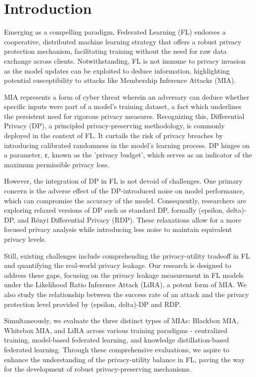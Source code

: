 \section{Introduction}

Emerging as a compelling paradigm, Federated Learning (FL) endorses a cooperative, distributed machine learning strategy that offers a robust privacy protection mechanism, facilitating training without the need for raw data exchange across clients. Notwithstanding, FL is not immune to privacy invasion as the model updates can be exploited to deduce information, highlighting potential susceptibility to attacks like Membership Inference Attacks (MIA).

MIA represents a form of cyber threat wherein an adversary can deduce whether specific inputs were part of a model's training dataset, a fact which underlines the persistent need for rigorous privacy measures. Recognizing this, Differential Privacy (DP), a principled privacy-preserving methodology, is commonly deployed in the context of FL. It curtails the risk of privacy breaches by introducing calibrated randomness in the model's learning process. DP hinges on a parameter, ε, known as the 'privacy budget', which serves as an indicator of the maximum permissible privacy loss.

However, the integration of DP in FL is not devoid of challenges. One primary concern is the adverse effect of the DP-introduced noise on model performance, which can compromise the accuracy of the model. Consequently, researchers are exploring relaxed versions of DP such as standard DP, formally (epsilon, delta)-DP, and Rényi Differential Privacy (RDP). These relaxations allow for a more focused privacy analysis while introducing less noise to maintain equivalent privacy levels.

Still, existing challenges include comprehending the privacy-utility tradeoff in FL and quantifying the real-world privacy leakage. Our research is designed to address these gaps, focusing on the privacy leakage measurement in FL models under the Likelihood Ratio Inference Attack (LiRA), a potent form of MIA. We also study the relationship between the success rate of an attack and the privacy protection level provided by (epsilon, delta)-DP and RDP.

Simultaneously, we evaluate the three distinct types of MIAs: Blackbox MIA, Whitebox MIA, and LiRA across various training paradigms - centralized training, model-based federated learning, and knowledge distillation-based federated learning. Through these comprehensive evaluations, we aspire to enhance the understanding of the privacy-utility balance in FL, paving the way for the development of robust privacy-preserving mechanisms.

